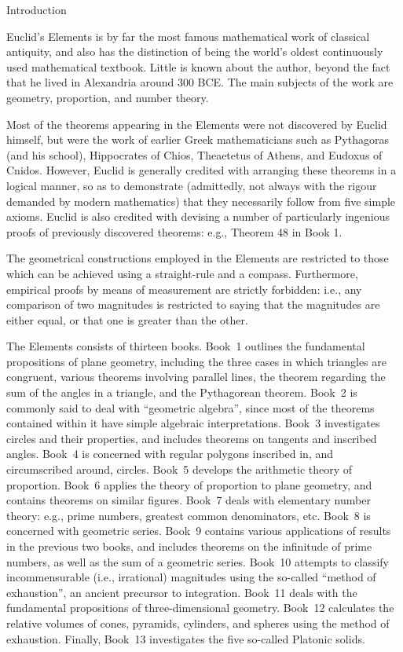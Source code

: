 \thispagestyle{empty}
\begin{center}
{\Large Introduction}
\end{center}

Euclid's Elements is by far the most famous mathematical work of classical antiquity, and also has the distinction of being the world's oldest continuously used mathematical textbook. Little is known about the author, beyond the fact that he lived in Alexandria around 300 BCE. The main subjects  of the work 
are geometry, proportion, and number theory. 

Most of the theorems appearing in the Elements were not discovered by Euclid himself, but were the work of earlier Greek mathematicians such as Pythagoras (and his school), Hippocrates of Chios, Theaetetus of Athens, and Eudoxus of Cnidos. However, Euclid is generally credited with arranging these theorems in a logical manner, so as to demonstrate (admittedly, not always with the rigour demanded by modern mathematics) that they necessarily follow from five simple axioms. Euclid is also credited with devising a number of particularly ingenious proofs of previously discovered theorems: {\rm e.g.}, Theorem 48 in Book 1.

The geometrical constructions employed in the Elements are restricted to
those which can be achieved using a straight-rule and a compass.
Furthermore, empirical proofs by means of measurement are strictly forbidden:
{\rm i.e.}, 
any comparison of two magnitudes is restricted to saying that the magnitudes
are either equal, or that one is greater than the other.

The Elements consists of thirteen books. Book~1 outlines the fundamental
propositions of plane geometry, including the three cases in which
triangles are congruent, various theorems involving parallel lines, the theorem regarding the sum of the angles in a triangle, and the
Pythagorean theorem. Book~2 is commonly said to deal with ``geometric algebra'', since most of the theorems contained within it have simple algebraic
interpretations.
Book~3 investigates circles and their properties, and includes
theorems on tangents and inscribed angles. Book~4
is concerned with regular polygons inscribed in, and circumscribed around, circles.
Book~5 develops the arithmetic theory of proportion.
Book~6 applies the theory of proportion to plane geometry, and
contains theorems on similar figures. Book~7 deals
with elementary number theory: {\rm e.g.}, prime numbers,
greatest common denominators, {\rm etc.} Book~8 is concerned with geometric
series. Book~9 contains various applications of  results in the
previous two books, and includes theorems on the
infinitude of prime numbers, as well as the sum of a geometric series.
Book~10 attempts to classify incommensurable ({\rm i.e.}, irrational)
magnitudes using the so-called ``method of exhaustion'', an ancient precursor to integration. Book~11 deals with the fundamental propositions of
three-dimensional geometry. Book~12 calculates the relative volumes of
cones, pyramids, cylinders, and spheres using the method of exhaustion.
Finally, Book~13 investigates the five so-called Platonic solids.

